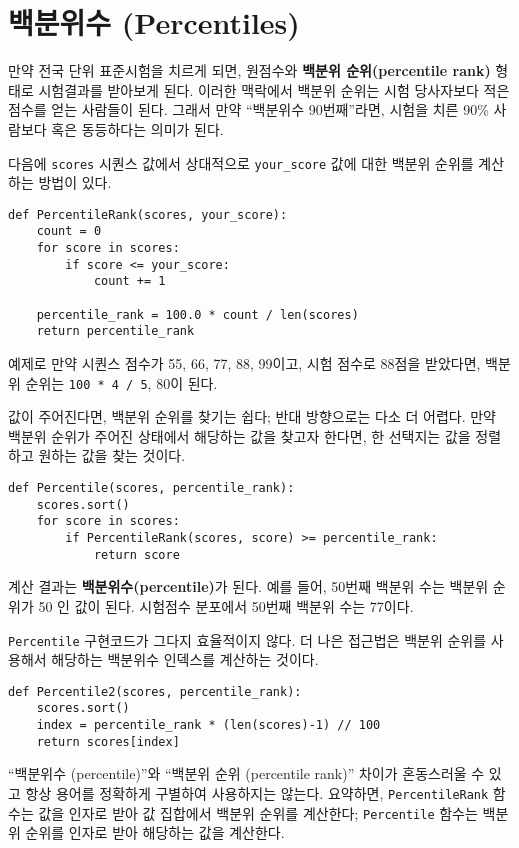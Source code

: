 \section{백분위수 (Percentiles)}

만약 전국 단위 표준시험을 치르게 되면, 원점수와 {\bf 백분위 순위(percentile rank)} 형태로 시험결과를 받아보게 된다. 이러한 맥락에서 백분위 순위는 시험 당사자보다 적은 점수를 얻는 사람들이 된다.
그래서 만약 ``백분위수 90번째''라면, 시험을 치른 90\% 사람보다 혹은 동등하다는 의미가 된다.

다음에 {\tt scores} 시퀀스 값에서 상대적으로 \verb"your_score" 값에 대한 백분위 순위를 계산하는 방법이 있다.

%
\begin{verbatim}
def PercentileRank(scores, your_score):
    count = 0
    for score in scores:
        if score <= your_score:
            count += 1

    percentile_rank = 100.0 * count / len(scores)
    return percentile_rank
\end{verbatim}

예제로 만약 시퀀스 점수가 55, 66, 77, 88, 99이고, 시험 점수로 88점을 받았다면, 
백분위 순위는 {\tt 100 * 4 / 5}, 80이 된다.

값이 주어진다면, 백분위 순위를 찾기는 쉽다; 반대 방향으로는 다소 더 어렵다.
만약 백분위 순위가 주어진 상태에서 해당하는 값을 찾고자 한다면, 한 선택지는 값을 정렬하고
원하는 값을 찾는 것이다.

%
\begin{verbatim}
def Percentile(scores, percentile_rank):
    scores.sort()
    for score in scores:
        if PercentileRank(scores, score) >= percentile_rank:
            return score
\end{verbatim}

계산 결과는 {\bf 백분위수(percentile)}가 된다. 
예를 들어, 50번째 백분위 수는 백분위 순위가 50 인 값이 된다. 
시험점수 분포에서 50번째 백분위 수는 77이다.

{\tt Percentile} 구현코드가 그다지 효율적이지 않다.
더 나은 접근법은 백분위 순위를 사용해서 해당하는 백분위수 인덱스를 계산하는 것이다.

\begin{verbatim}
def Percentile2(scores, percentile_rank):
    scores.sort()
    index = percentile_rank * (len(scores)-1) // 100
    return scores[index]
\end{verbatim}

``백분위수 (percentile)''와 ``백분위 순위 (percentile rank)'' 차이가 혼동스러울 수 있고
항상 용어를 정확하게 구별하여 사용하지는 않는다. 요약하면,
{\tt PercentileRank} 함수는 값을 인자로 받아 값 집합에서 백분위 순위를 계산한다;
{\tt Percentile} 함수는 백분위 순위를 인자로 받아 해당하는 값을 계산한다. 

